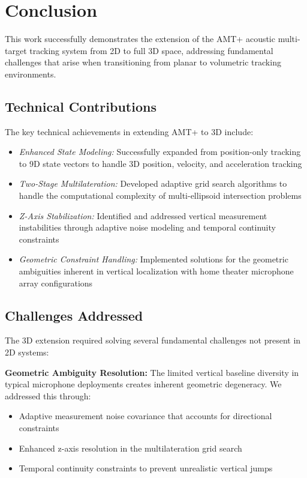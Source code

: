 \documentclass[a4paper]{article}
\begin{document}
\section{Conclusion}

This work successfully demonstrates the extension of the AMT+ acoustic multi-target tracking system from 2D to full 3D space, addressing fundamental challenges that arise when transitioning from planar to volumetric tracking environments.

\subsection{Technical Contributions}

The key technical achievements in extending AMT+ to 3D include:

\begin{itemize}
\item {\em Enhanced State Modeling:} Successfully expanded from position-only tracking to 9D state vectors to handle 3D position, velocity, and acceleration tracking
\item {\em Two-Stage Multilateration:} Developed adaptive grid search algorithms to handle the computational complexity of multi-ellipsoid intersection problems
\item {\em Z-Axis Stabilization:} Identified and addressed vertical measurement instabilities through adaptive noise modeling and temporal continuity constraints
\item {\em Geometric Constraint Handling:} Implemented solutions for the geometric ambiguities inherent in vertical localization with home theater microphone array configurations
\end{itemize}

\subsection{Challenges Addressed}

The 3D extension required solving several fundamental challenges not present in 2D systems:

{\bf Geometric Ambiguity Resolution:} The limited vertical baseline diversity in typical microphone deployments creates inherent geometric degeneracy. We addressed this through:
\begin{itemize}
\item Adaptive measurement noise covariance that accounts for directional constraints
\item Enhanced z-axis resolution in the multilateration grid search
\item Temporal continuity constraints to prevent unrealistic vertical jumps
\end{itemize}
\end{document}
